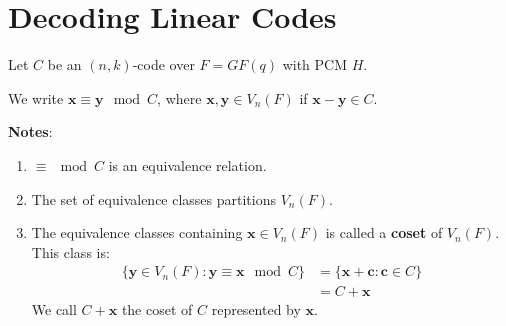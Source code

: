 \section{Decoding Linear Codes}
Let $ C $ be an $ (n,k) $-code over $ F=GF(q) $ with PCM $ H $.

\begin{defbox}
    \begin{definition}
        We write $ \bm{x}\equiv \bm{y} \mod C $, where $ \bm{x},\bm{y}\in V_n(F) $
        if $ \bm{x}-\bm{y}\in C $.
    \end{definition}
\end{defbox}

\textbf{Notes}:
\begin{enumerate}[label=(\arabic*)]
    \item $ \equiv\mod C $ is an equivalence relation.
    \item The set of equivalence classes partitions $ V_n(F) $.
    \item The equivalence classes containing $ \bm{x}\in V_n(F) $
          is called a \textbf{coset} of $ V_n(F) $. This class is:
          \begin{align*}
              \{\bm{y}\in V_n(F):\bm{y}\equiv \bm{x}\mod C\}
               & =\{\bm{x}+\bm{c}:\bm{c}\in C\} \\
               & =C+\bm{x}
          \end{align*}
          We call $ C+\bm{x} $ the coset of $ C $ represented by $ \bm{x} $.
\end{enumerate}

